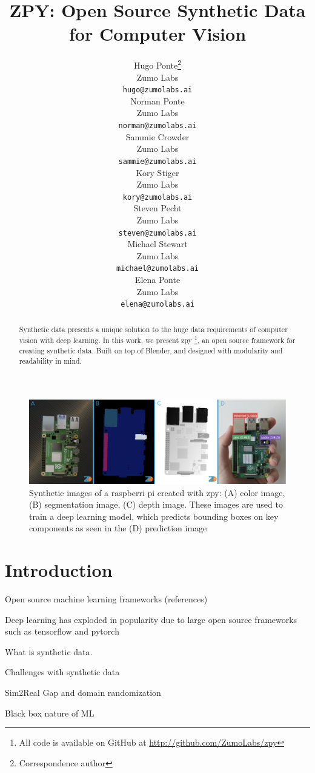 \documentclass{article}
\title{ZPY: Open Source Synthetic Data for Computer Vision}
\author{
	{\hspace{1mm}Hugo Ponte}\footnote{Correspondence author} \\ 
	Zumo Labs \\
	\texttt{hugo@zumolabs.ai} \\
	\And
	{\hspace{1mm}Norman Ponte} \\
	Zumo Labs \\
	\texttt{norman@zumolabs.ai} \\
	\And
	{\hspace{1mm}Sammie Crowder} \\
	Zumo Labs \\
	\texttt{sammie@zumolabs.ai} \\
	\And
	{\hspace{1mm}Kory Stiger} \\
	Zumo Labs \\
	\texttt{kory@zumolabs.ai} \\
	\And
	{\hspace{1mm}Steven Pecht} \\
	Zumo Labs \\
	\texttt{steven@zumolabs.ai} \\
	\And
	{\hspace{1mm}Michael Stewart} \\
	Zumo Labs \\
	\texttt{michael@zumolabs.ai} \\
	\And
	{\hspace{1mm}Elena Ponte} \\
	Zumo Labs \\
	\texttt{elena@zumolabs.ai} \\
}
\date{}
\begin{document}
\maketitle

\begin{abstract}
Synthetic data presents a unique solution to the huge data requirements of computer vision with deep learning. In this work, we present zpy \footnote{All code is available on GitHub at \url{http://github.com/ZumoLabs/zpy}}, an open source framework for creating synthetic data. Built on top of Blender, and designed with modularity and readability in mind.
\end{abstract}


\begin{figure}[!ht]
	\centering
	\includegraphics[width=\textwidth]{cover.png}
	\caption{Synthetic images of a raspberri pi created with zpy: (A) color image, (B) segmentation image, (C) depth image. These images are used to train a deep learning model, which predicts bounding boxes on key components as seen in the (D) prediction image}
	\label{fig:fig1}
\end{figure}

\section{Introduction}
\label{sec:introduction}

Open source machine learning frameworks (references)

Deep learning has exploded in popularity due to large open source frameworks such as tensorflow and pytorch

What is synthetic data.

Challenges with synthetic data

Sim2Real Gap and domain randomization

Black box nature of ML
\end{document}
